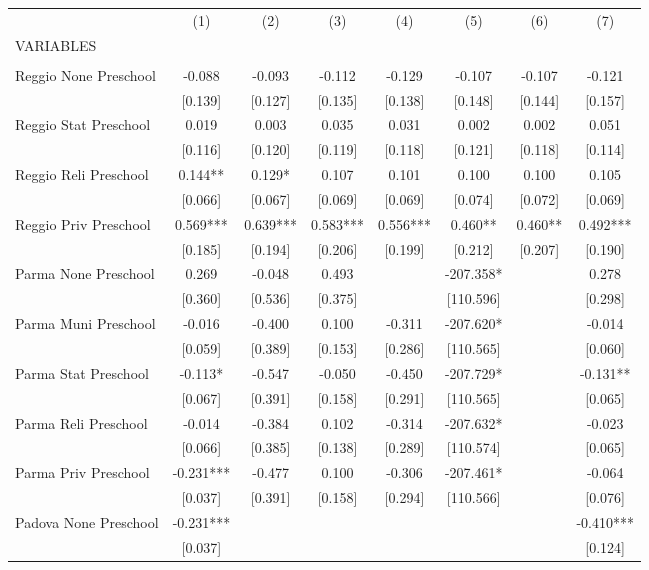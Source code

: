 \begin{tabular}{lccccccc} \hline
 & (1) & (2) & (3) & (4) & (5) & (6) & (7) \\
VARIABLES &  &  &  &  &  &  &  \\ \hline
 &  &  &  &  &  &  &  \\
Reggio None Preschool & -0.088 & -0.093 & -0.112 & -0.129 & -0.107 & -0.107 & -0.121 \\
 & [0.139] & [0.127] & [0.135] & [0.138] & [0.148] & [0.144] & [0.157] \\
Reggio Stat Preschool & 0.019 & 0.003 & 0.035 & 0.031 & 0.002 & 0.002 & 0.051 \\
 & [0.116] & [0.120] & [0.119] & [0.118] & [0.121] & [0.118] & [0.114] \\
Reggio Reli Preschool & 0.144** & 0.129* & 0.107 & 0.101 & 0.100 & 0.100 & 0.105 \\
 & [0.066] & [0.067] & [0.069] & [0.069] & [0.074] & [0.072] & [0.069] \\
Reggio Priv Preschool & 0.569*** & 0.639*** & 0.583*** & 0.556*** & 0.460** & 0.460** & 0.492*** \\
 & [0.185] & [0.194] & [0.206] & [0.199] & [0.212] & [0.207] & [0.190] \\
Parma None Preschool & 0.269 & -0.048 & 0.493 &  & -207.358* &  & 0.278 \\
 & [0.360] & [0.536] & [0.375] &  & [110.596] &  & [0.298] \\
Parma Muni Preschool & -0.016 & -0.400 & 0.100 & -0.311 & -207.620* &  & -0.014 \\
 & [0.059] & [0.389] & [0.153] & [0.286] & [110.565] &  & [0.060] \\
Parma Stat Preschool & -0.113* & -0.547 & -0.050 & -0.450 & -207.729* &  & -0.131** \\
 & [0.067] & [0.391] & [0.158] & [0.291] & [110.565] &  & [0.065] \\
Parma Reli Preschool & -0.014 & -0.384 & 0.102 & -0.314 & -207.632* &  & -0.023 \\
 & [0.066] & [0.385] & [0.138] & [0.289] & [110.574] &  & [0.065] \\
Parma Priv Preschool & -0.231*** & -0.477 & 0.100 & -0.306 & -207.461* &  & -0.064 \\
 & [0.037] & [0.391] & [0.158] & [0.294] & [110.566] &  & [0.076] \\
Padova None Preschool & -0.231*** &  &  &  &  &  & -0.410*** \\
 & [0.037] &  &  &  &  &  & [0.124] \\

\end{tabular}
